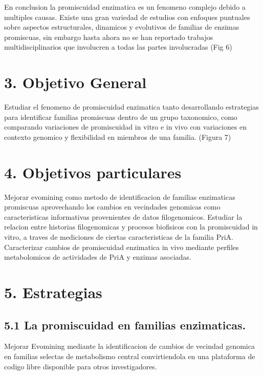 \documentclass[12pt,twoside]{reedthesis}
\begin{document}
  En conclusion la promiscuidad enzimatica es un fenomeno complejo debido
  a multiples causas. Existe una gran variedad de estudios con enfoques
  puntuales sobre aspectos estructurales, dinamicos y evolutivos de
  familias de enzimas promiscuas, sin embargo hasta ahora no se han
  reportado trabajos multidisciplinarios que involucren a todas las partes
  involucradas (Fig 6)
  
  \section{3. Objetivo General}\label{objetivo-general}
  
  Estudiar el fenomeno de promiscuidad enzimatica tanto desarrollando
  estrategias para identificar familias promiscuas dentro de un grupo
  taxonomico, como comparando variaciones de promiscuidad in vitro e in
  vivo con variaciones en contexto genomico y flexibilidad en miembros de
  una familia. (Figura 7)
  
  \section{4. Objetivos particulares}\label{objetivos-particulares}
  
  Mejorar evomining como metodo de identificacion de familias enzimaticas
  promiscuas aprovechando los cambios en vecindades genomicas como
  caracteristicas informativas provenientes de datos filogenomicos.
  Estudiar la relacion entre historias filogenomicas y procesos biofisicos
  con la promiscuidad in vitro, a traves de mediciones de ciertas
  caracteristicas de la familia PriA. Caracterizar cambios de promiscuidad
  enzimatica in vivo mediante perfiles metabolomicos de actividades de
  PriA y enzimas asociadas.
  
  \section{5. Estrategias}\label{estrategias}
  
  \subsection{5.1 La promiscuidad en familias
  enzimaticas.}\label{la-promiscuidad-en-familias-enzimaticas.}
  
  Mejorar Evomining mediante la identificacion de cambios de vecindad
  genomica en familias selectas de metabolismo central convirtiendola en
  una plataforma de codigo libre disponible para otros investigadores.
  
\end{document}
